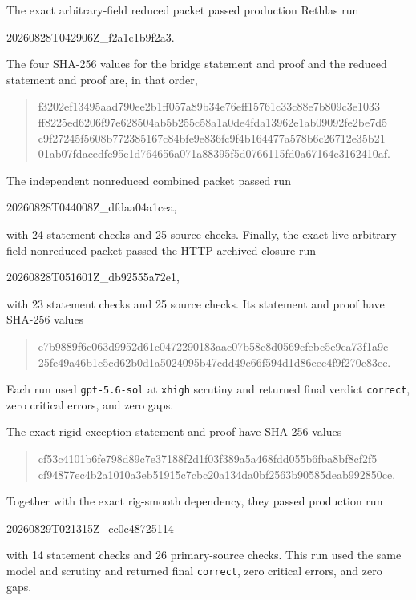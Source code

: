 The exact arbitrary-field reduced packet passed production Rethlas run
\begin{center}
\small\ttfamily 20260828T042906Z\_f2a1c1b9f2a3.
\end{center}
The four SHA-256 values for the bridge statement and proof and the reduced
statement and proof are, in that order,
\begin{quote}
\small\ttfamily
f3202ef13495aad790ee2b1ff057a89b34e76eff15761c33c88e7b809c3e1033\\
ff8225ed6206f97e628504ab5b255c58a1a0de4fda13962e1ab09092fe2be7d5\\
c9f27245f5608b772385167c84bfe9e836fc9f4b164477a578b6c26712e35b21\\
01ab07fdacedfe95e1d764656a071a88395f5d0766115fd0a67164e3162410af.
\end{quote}
The independent nonreduced combined packet passed run
\begin{center}
\small\ttfamily 20260828T044008Z\_dfdaa04a1cea,
\end{center}
with 24 statement checks and 25 source checks.  Finally, the exact-live
arbitrary-field nonreduced packet passed the HTTP-archived closure run
\begin{center}
\small\ttfamily 20260828T051601Z\_db92555a72e1,
\end{center}
with 23 statement checks and 25 source checks.  Its statement and proof have
SHA-256 values
\begin{quote}
\small\ttfamily
e7b9889f6c063d9952d61c0472290183aac07b58c8d0569cfebc5e9ea73f1a9c\\
25fe49a46b1c5cd62b0d1a5024095b47cdd49c66f594d1d86eec4f9f270c83ec.
\end{quote}
Each run used
\texttt{gpt-5.6-sol} at \texttt{xhigh} scrutiny and returned final verdict
\texttt{correct}, zero critical errors, and zero gaps.

The exact rigid-exception statement and proof have SHA-256 values
\begin{quote}
\small\ttfamily
cf53c4101b6fe798d89c7e37188f2d1f03f389a5a468fdd055b6fba8bf8cf2f5\\
cf94877ec4b2a1010a3eb51915c7cbc20a134da0bf2563b90585deab992850ce.
\end{quote}
Together with the exact rig-smooth dependency, they passed production run
\begin{center}
\small\ttfamily 20260829T021315Z\_cc0c48725114
\end{center}
with 14 statement checks and 26 primary-source checks.  This run used the
same model and scrutiny and returned final \texttt{correct}, zero critical
errors, and zero gaps.

